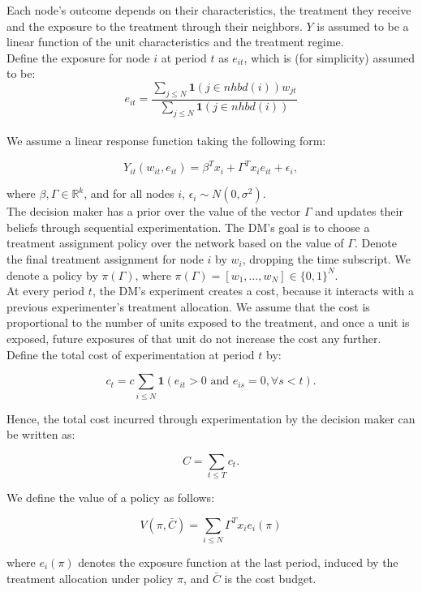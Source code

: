 \documentclass[12pt,a4paper]{article}
\begin{document}
Each node's outcome depends on their characteristics, the treatment they receive and the exposure to the treatment through their neighbors. $Y$ is assumed to be a linear function of the unit characteristics and the treatment regime. \\

Define the exposure for node $i$ at period $t$ as $e_{it}$, which is (for simplicity) assumed to be: 
$$e_{it} = \frac { \sum_{j \leq N}  \mathbf{1}(j \in nhbd(i)) w_{jt}}{ \sum_{j \leq N} \mathbf{1}(j \in nhbd(i)) }$$\\

We assume a linear response function taking the following form:

$$Y_{it}( w_{it}, e_{it}) = \beta^T x_i + \Gamma^T x_i e_{it} + \epsilon_i,$$

where $\beta, \Gamma \in \mathbb{R}^k$, and for all nodes $i$, $\epsilon_i \sim N(0, \sigma^2)$.\\

The decision maker has a prior over the value of the vector $\Gamma$ and updates their beliefs through sequential experimentation. The DM's goal is to choose a treatment assignment policy over the network based on the value of $\Gamma$. Denote the final treatment assignment for node $i$ by $w_i$, dropping the time subscript. We denote a policy by $\pi(\Gamma)$, where $\pi(\Gamma)=[w_1, \dots , w_N] \in \{0,1\}^N$.\\

At every period $t$, the DM's experiment creates a cost, because it interacts with a previous experimenter's treatment allocation. We assume that the cost is proportional to the number of units exposed to the treatment, and once a unit is exposed, future exposures of that unit do not increase the cost any further. Define the total cost of experimentation at period $t$ by:

$$c_t = c \sum_{i \leq N} \mathbf{1}\left( e_{it} > 0 \mbox{ and } e_{is}=0,  \forall s<t \right) .$$

Hence, the total cost incurred through experimentation by the decision maker can be written as:

$$ C= \sum_{t \leq T} c_t  .$$

We define the value of a policy as follows:

$$V(\pi, \bar{C})=\sum_{i \leq N} \Gamma^T x_i e_i(\pi) $$

where $e_i(\pi)$ denotes the exposure function at the last period, induced by the treatment allocation under policy $\pi$, and $\bar{C}$ is the cost budget. \\
\end{document}
